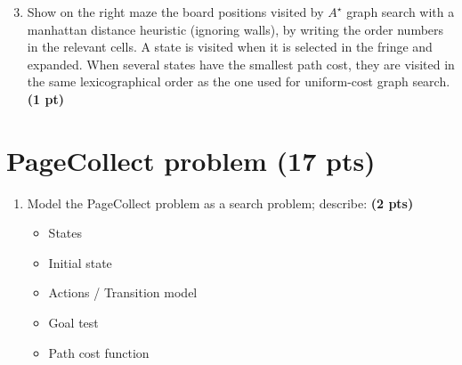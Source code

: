 \documentclass[11pt,a4paper]{report}
\begin{document}
\begin{enumerate}
\setcounter{enumi}{2}
\item Show on the right maze the board positions visited by $A^{\star}$ graph search with a manhattan distance heuristic (ignoring walls), by writing the order numbers in the relevant cells. A state is visited when it is selected in the fringe and expanded. When several states have the smallest path cost, they are visited in the same lexicographical order as the one used for uniform-cost graph search. \textbf{(1 pt)}
\end{enumerate}

\begin{answers}[5.2cm]
\begin{center}
\end{center}
\end{answers}




\section{PageCollect problem (17 pts)}

\begin{enumerate}
  \item Model the PageCollect problem as a search problem; describe: \textbf{(2 pts)}
		\begin{itemize}
			\item States
			\item Initial state
			\item Actions / Transition model
			\item Goal test
			\item Path cost function
		\end{itemize}
\end{enumerate}

\begin{answers}[8cm]
\end{answers}
\end{document}
